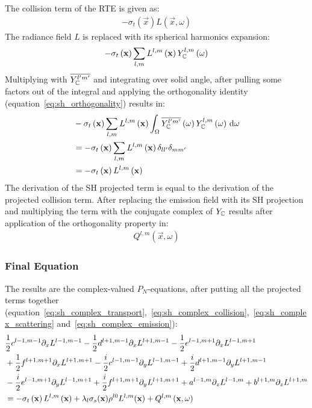 The collision term of the RTE is given as:
\begin{align*}
-\sigma_t\left(\vec{x}\right)L\left(\vec{x}, \omega\right)
\end{align*}
The radiance field $L$ is replaced with its spherical harmonics expansion:
\begin{align*}
-\sigma_t\left(\mathbf{x}\right)
\sum_{l,m}
{
L^{l,m}\left(\mathbf{x}\right )Y_{\mathbb{C}}^{l,m}\left(\omega\right)
}
\end{align*}
Multiplying with $\overline{Y_{\mathbb{C}}^{l'm'}}$ and integrating over solid angle, after pulling some factors out of the integral and applying the orthogonality identity (equation~\ref{eq:sh_orthogonality}) results in:
\begin{align}
&-\sigma_t\left(\mathbf{x}\right)\sum_{l,m}{L^{l,m}\left(\mathbf{x}\right )\int_\Omega\overline{Y_{\mathbb{C}}^{l'm'}}\left(\omega\right)Y_{\mathbb{C}}^{l,m}\left(\omega\right)\,\mathrm{d}\omega}
\nonumber
\\
&= -\sigma_t\left(\mathbf{x}\right)\sum_{l,m}{L^{l,m}\left(\mathbf{x}\right )\delta_{ll'}\delta_{mm'}}
\nonumber
\\
&= -\sigma_t\left(\mathbf{x}\right)L^{l,m}\left(\mathbf{x}\right )
\label{eq:sh_complex_collision}
\end{align}
The derivation of the SH projected term is equal to the derivation of the projected collision term. After replacing the emission field with its SH projection and multiplying the term with the conjugate complex of $Y_{\mathbb{C}}$ results after application of the orthogonality property in:
\begin{align}
Q^{l,m}\left(\vec{x}, \omega\right)
\label{eq:sh_complex_emission}
\end{align}


\subsubsection*{Final Equation}

The results are the complex-valued $P_N$-equations, after putting all the projected terms together (equation~\ref{eq:sh_complex_transport},~\ref{eq:sh_complex_collision},~\ref{eq:sh_complex_scattering} and~\ref{eq:sh_complex_emission}):
\begin{align}
&
\frac{1}{2}c^{l-1, m-1}\partial_x L^{l-1,m-1}
-\frac{1}{2}d^{l+1, m-1}\partial_x L^{l+1,m-1}
-\frac{1}{2}e^{l-1, m+1}\partial_x L^{l-1,m+1}
\nonumber
\\
&
+\frac{1}{2}f^{l+1, m+1}\partial_x L^{l+1,m+1}
-\frac{i}{2}c^{l-1, m-1}\partial_y L^{l-1,m-1}
+\frac{i}{2}d^{l+1, m-1}\partial_y L^{l+1,m-1}
\nonumber
\\
&
-\frac{i}{2}e^{l-1, m+1}\partial_y L^{l-1,m+1}
+\frac{i}{2}f^{l+1, m+1}\partial_y L^{l+1,m+1}
+a^{l-1, m}\partial_z L^{l-1,m}
+b^{l+1, m}\partial_z L^{l+1,m}
\nonumber
\\
&
=
-\sigma_t\left(\mathbf{x}\right)L^{l,m}\left(\mathbf{x}\right )
+
\lambda_l
\sigma_s(\mathbf{x})
\rho^{l0}L^{l,m}(\mathbf{x}) + Q^{l,m}\left(\mathbf{x}, \omega\right)
\label{eq:sh_pne_complex}
\end{align}